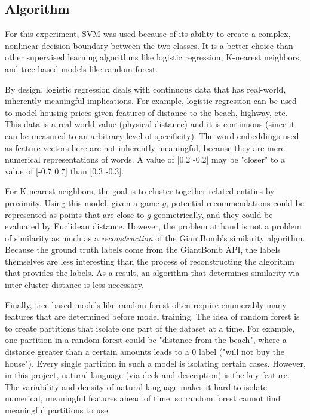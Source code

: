 \documentclass[10pt,twocolumn]{article}
\begin{document}
\subsection{Algorithm}
For this experiment, SVM was used because of its ability to create a complex, nonlinear decision boundary between the two classes. \cite{CortesVapnikSVM} It is a better choice than other supervised learning algorithms like logistic regression, K-nearest neighbors, and tree-based models like random forest. 

By design, logistic regression deals with continuous data that has real-world, inherently meaningful implications. For example, logistic regression can be used to model housing prices given features of distance to the beach, highway, etc. This data is a real-world value (physical distance) and it is continuous (since it can be measured to an arbitrary level of specificity). The word embeddings used as feature vectors here are not inherently meaningful, because they are mere numerical representations of words. A value of [0.2 -0.2] may be "closer" to a value of [-0.7 0.7] than [0.3 -0.3]. 

For K-nearest neighbors, the goal is to cluster together related entities by proximity. Using this model, given a game $g$, potential recommendations could be represented as points that are close to $g$ geometrically, and they could be evaluated by Euclidean distance. However, the problem at hand is not a problem of similarity as much as a \textit{reconstruction} of the GiantBomb's similarity algorithm. Because the ground truth labels come from the GiantBomb API, the labels themselves are less interesting than the process of reconstructing the algorithm that provides the labels. As a result, an algorithm that determines similarity via inter-cluster distance is less necessary.

Finally, tree-based models like random forest often require enumerably many features that are determined before model training. The idea of random forest is to create partitions that isolate one part of the dataset at a time. For example, one partition in a random forest could be "distance from the beach", where a distance greater than a certain amounts leads to a 0 label ("will not buy the house"). Every single partition in such a model is isolating certain cases. However, in this project, natural language (via deck and description) is the key feature. The variability and density of natural language makes it hard to isolate numerical, meaningful features ahead of time, so random forest cannot find meaningful partitions to use.
\end{document}
